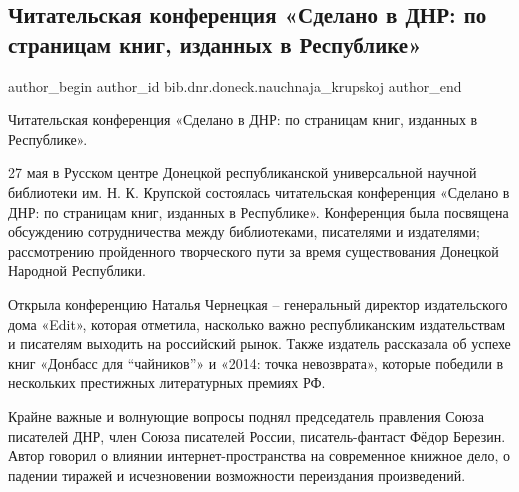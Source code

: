  
 
 
 
 
 
\subsection{Читательская конференция «Сделано в ДНР: по страницам книг, изданных в Республике»}
\label{sec:27_05_2021.fb.bib.dnr.doneck.nauchnaja_krupskoj.1.chitatel_konferencia_dnr}
 
\ifcmt
 author_begin
   author_id bib.dnr.doneck.nauchnaja_krupskoj
 author_end
\fi

Читательская конференция «Сделано в ДНР: по страницам книг, изданных в
Республике».

27 мая в Русском центре Донецкой республиканской универсальной научной
библиотеки им. Н. К. Крупской состоялась читательская конференция «Сделано в
ДНР: по страницам книг, изданных в Республике». Конференция была посвящена
обсуждению сотрудничества между библиотеками, писателями и издателями;
рассмотрению пройденного творческого пути за время существования Донецкой
Народной Республики.


Открыла конференцию Наталья Чернецкая – генеральный директор издательского дома
«Edit», которая отметила, насколько важно республиканским издательствам и
писателям выходить на российский рынок. Также издатель рассказала об успехе
книг «Донбасс для \enquote{чайников}» и «2014: точка невозврата», которые победили в
нескольких престижных литературных премиях РФ.


Крайне важные и волнующие вопросы поднял председатель правления Союза писателей
ДНР, член Союза писателей России, писатель-фантаст Фёдор Березин. Автор говорил
о влиянии интернет-пространства на современное книжное дело, о падении тиражей
и исчезновении возможности переиздания произведений.

